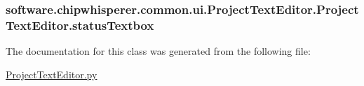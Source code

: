 \subsubsection[{status\+Textbox}]{\setlength{\rightskip}{0pt plus 5cm}software.\+chipwhisperer.\+common.\+ui.\+Project\+Text\+Editor.\+Project\+Text\+Editor.\+status\+Textbox}\label{classsoftware_1_1chipwhisperer_1_1common_1_1ui_1_1ProjectTextEditor_1_1ProjectTextEditor_aa05d65608805e607efb1c0061ed064a7}


The documentation for this class was generated from the following file\+:\begin{DoxyCompactItemize}
\item 
\hyperlink{ProjectTextEditor_8py}{Project\+Text\+Editor.\+py}\end{DoxyCompactItemize}
